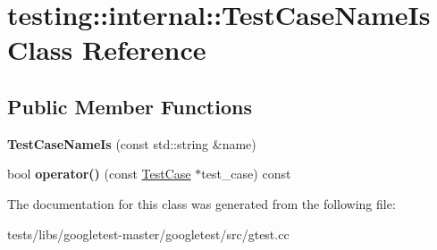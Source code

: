 \hypertarget{classtesting_1_1internal_1_1TestCaseNameIs}{}\section{testing\+:\+:internal\+:\+:Test\+Case\+Name\+Is Class Reference}
\label{classtesting_1_1internal_1_1TestCaseNameIs}
\subsection*{Public Member Functions}
\begin{DoxyCompactItemize}
\item 
\mbox{\label{classtesting_1_1internal_1_1TestCaseNameIs_a7c983707f4cfe7f36dbabc95da5113c4}} 
{\bfseries Test\+Case\+Name\+Is} (const std\+::string \&name)
\item 
\mbox{\label{classtesting_1_1internal_1_1TestCaseNameIs_aa96c4e9facbaa7043c8f0b34465d1eae}} 
bool {\bfseries operator()} (const \hyperlink{classtesting_1_1TestCase}{Test\+Case} $\ast$test\+\_\+case) const
\end{DoxyCompactItemize}


The documentation for this class was generated from the following file\+:\begin{DoxyCompactItemize}
\item 
tests/libs/googletest-\/master/googletest/src/gtest.\+cc\end{DoxyCompactItemize}
